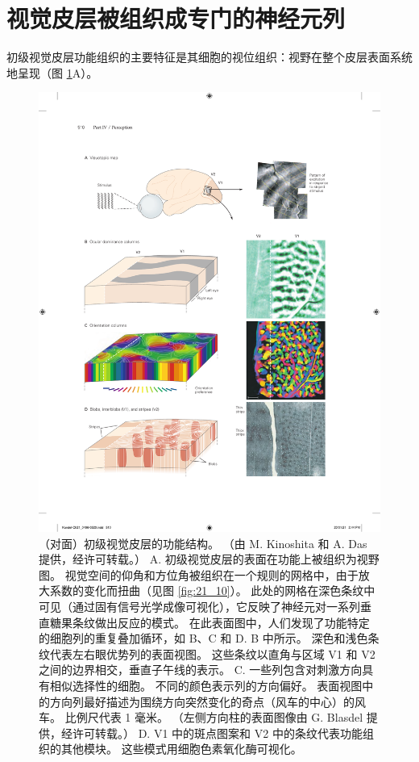 \section{视觉皮层被组织成专门的神经元列}
初级视觉皮层功能组织的主要特征是其细胞的视位组织：视野在整个皮层表面系统地呈现（图 \ref{fig:21_11}A）。

\begin{figure}[htbp]
	\centering
	\includegraphics[width=1.0\linewidth]{chap21/fig_21_11}
	\caption{（对面）初级视觉皮层的功能结构。 （由 M. Kinoshita 和 A. Das 提供，经许可转载。） 
		A. 初级视觉皮层的表面在功能上被组织为视野图。 
		视觉空间的仰角和方位角被组织在一个规则的网格中，由于放大系数的变化而扭曲（见图 \ref{fig:21_10}）。 
		此处的网格在深色条纹中可见（通过固有信号光学成像可视化），它反映了神经元对一系列垂直糖果条纹做出反应的模式。 
		在此表面图中，人们发现了功能特定的细胞列的重复叠加循环，如 B、C 和 D. B 中所示。
		深色和浅色条纹代表左右眼优势列的表面视图。 
		这些条纹以直角与区域 V1 和 V2 之间的边界相交，垂直子午线的表示。 
		C. 一些列包含对刺激方向具有相似选择性的细胞。 
		不同的颜色表示列的方向偏好。 
		表面视图中的方向列最好描述为围绕方向突然变化的奇点（风车的中心）的风车。 比例尺代表 1 毫米。 （左侧方向柱的表面图像由 G. Blasdel 提供，经许可转载。） 
		D. V1 中的斑点图案和 V2 中的条纹代表功能组织的其他模块。 
		这些模式用细胞色素氧化酶可视化。}
	\label{fig:21_11}
\end{figure}

